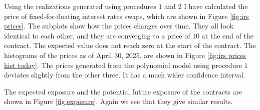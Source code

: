 \noindent Using the realizations generated using procedures $1$ and $2$ I have calculated the price of fixed-for-floating interest rates swaps, which are shown in Figure \ref{fig:irs prices}. The subplots show how the prices changes over time. They all look identical to each other, and they are converging to a price of $10$ at the end of the contract. The expected value does not reach zero at the start of the contract. The histograms of the prices as of April $30$, $2025$, are shown in Figure \ref{fig:irs prices hist today}. The prices generated from the polynomial model using procedure $1$ deviates slightly from the other three. It has a much wider confidence interval.

The expected exposure and the potential future exposure of the contracts are shown in Figure \ref{fig:exposure}. Again we see that they give similar results.



